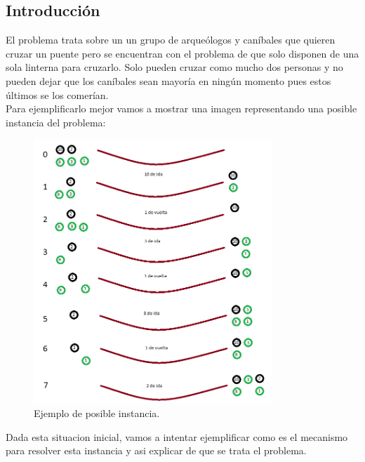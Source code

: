 \subsection{Introducción}
El problema trata sobre un un grupo de arqueólogos y caníbales que quieren cruzar un puente pero se encuentran con el problema de que solo disponen de una sola linterna para cruzarlo. Solo pueden cruzar como mucho dos personas y no pueden dejar que los caníbales sean mayoría en ningún momento pues estos últimos se los comerían. \\

Para ejemplificarlo mejor vamos a mostrar una imagen representando una posible instancia del problema:



\begin {figure} [H]
\begin {center}
 \includegraphics[width=0.8\textwidth,natwidth=610,natheight=642]{images/canibalesYArqueologos.png}
 \caption{Ejemplo de posible instancia.}
\end {center}
 \end{figure}

Dada esta situacion inicial, vamos a intentar ejemplificar como es el mecanismo para resolver esta instancia y asi explicar de que se trata el problema.

